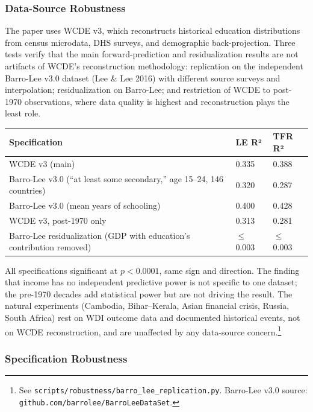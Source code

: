 \documentclass[12pt,letterpaper]{article}
\begin{document}
{\subsubsection{Data-Source Robustness}\label{appendix-data-source}

The paper uses WCDE v3, which reconstructs historical education
distributions from census microdata, DHS surveys, and demographic
back-projection. Three tests verify that the main forward-prediction
and residualization results are not artifacts of WCDE's reconstruction
methodology: replication on the independent Barro-Lee v3.0 dataset
(Lee \& Lee 2016) with different source surveys and interpolation;
residualization on Barro-Lee; and restriction of WCDE to post-1970
observations, where data quality is highest and reconstruction plays
the least role.

{\small
\begin{longtable}[]{@{}>{\raggedright\arraybackslash}p{10cm}ll@{}}
\toprule
Specification & LE R² & TFR R² \\
\midrule
\endhead
WCDE v3 (main) & 0.335 & 0.388 \\
Barro-Lee v3.0 (``at least some secondary,'' age 15--24, 146 countries) & 0.320 & 0.287 \\
Barro-Lee v3.0 (mean years of schooling) & 0.400 & 0.428 \\
WCDE v3, post-1970 only & 0.313 & 0.281 \\
Barro-Lee residualization (GDP with education's contribution removed) & $\leq$\,0.003 & $\leq$\,0.003 \\
\bottomrule
\end{longtable}
}

All specifications significant at $p < 0.0001$, same sign and
direction. The finding that income has no independent predictive power
is not specific to one dataset; the pre-1970 decades add statistical
power but are not driving the result. The natural experiments
(Cambodia, Bihar--Kerala, Asian financial crisis, Russia, South Africa)
rest on WDI outcome data and documented historical events, not on WCDE
reconstruction, and are unaffected by any data-source
concern.\footnote{See
\texttt{scripts/robustness/barro\_lee\_replication.py}. Barro-Lee v3.0
source: \texttt{github.com/barrolee/BarroLeeDataSet}.}

\subsubsection{Specification Robustness}\label{appendix-spec-robust}

}
\end{document}
